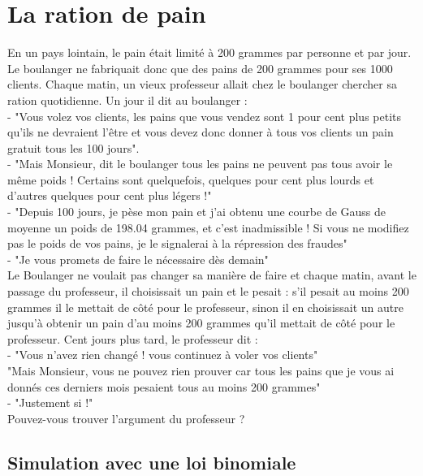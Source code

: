 \documentclass[a4paper,11pt]{book}
\begin{document}
\section{La ration de pain}
En un pays lointain, le pain \'etait limit\'e \`a 200 grammes par personne et 
par jour. Le boulanger ne fabriquait donc que des pains de 200 grammes pour 
ses 1000 clients. Chaque matin, un vieux professeur allait chez le boulanger 
chercher sa ration quotidienne. Un jour il dit au boulanger : \\
- "Vous volez vos clients, les pains 
que vous vendez sont 1 pour cent plus petits qu'ils ne devraient l'\^etre et 
 vous  devez donc donner \`a tous vos clients un pain gratuit tous les 
100 jours".\\
- "Mais Monsieur, dit le boulanger tous les pains ne peuvent pas tous avoir le 
m\^eme poids ! Certains sont quelquefois, quelques pour cent plus lourds et
d'autres quelques pour cent plus l\'egers !"\\
- "Depuis 100 jours, je p\`ese mon pain et j'ai obtenu une courbe de Gauss de
 moyenne un poids  de 198.04 
grammes, et c'est inadmissible ! Si vous ne modifiez pas le poids de vos pains, 
je le signalerai \`a la r\'epression des fraudes"\\
- "Je vous promets de faire le n\'ecessaire d\`es demain"\\
Le Boulanger ne voulait pas changer sa mani\`ere de faire et chaque matin, 
avant le passage du professeur, il  choisissait un pain et
le pesait : s'il pesait au moins 200 grammes il le mettait de c\^ot\'e pour 
le professeur, sinon il en choisissait un autre jusqu'\`a obtenir un pain d'au moins 200 grammes qu'il mettait de c\^ot\'e pour le professeur.
Cent jours plus tard, le professeur dit :\\
- "Vous n'avez rien chang\'e ! vous continuez \`a voler vos clients"\\
"Mais Monsieur, vous ne pouvez rien prouver car tous les pains que je vous ai 
donn\'es ces derniers mois pesaient tous au moins 200 grammes"\\
- "Justement si !" \\  
Pouvez-vous trouver l'argument du professeur ?  
\subsection{Simulation avec une loi binomiale}
\end{document}
